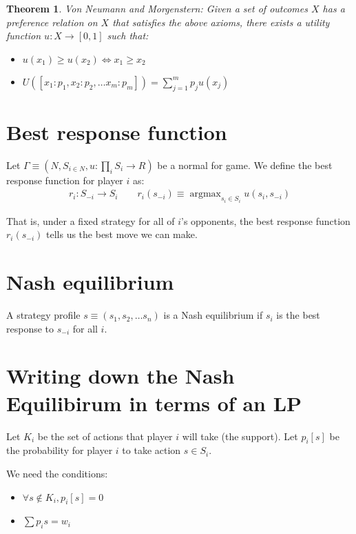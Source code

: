\documentclass[11pt]{book}
\DeclareMathOperator*{\argmax}{argmax} %
\newtheorem{theorem}[corollary]{Theorem}
\begin{document}
\begin{theorem}
    Von Neumann and Morgenstern: Given a set of outcomes $X$ has a preference
    relation on $X$ that satisfies the above axioms, there exists a utility function
    $u: X \rightarrow [0, 1]$ such that:
    \begin{itemize}
        \item $u(x_1) \geq u(x_2) \iff x_1 \geq x_2$
        \item $U([x_1: p_1, x_2:p_2, \dots x_m:p_m]) = \sum_{j=1}^m p_j u(x_j)$
    \end{itemize}
\end{theorem}



\section{Best response function}
Let $\Gamma \equiv (N, S_{i \in N}, u: \prod_i S_i \rightarrow R)$ be a normal
for game. We define the best response function for player $i$ as:
\begin{align*}
   r_i: S_{-i} \rightarrow S_i
    \qquad r_i(s_{-i}) \equiv \argmax_{s_i \in S_i}  u(s_i, s_{-i})
\end{align*}

That is, under a fixed strategy for all of $i$'s opponents, the best response
function $r_i(s_{-i})$ tells us the best move we can make.


\section{Nash equilibrium}

A strategy profile $s \equiv (s_1, s_2, \dots s_n)$ is a Nash equilibrium
if $s_i$ is the best response to $s_{-i}$ for all $i$.


\section{Writing down the Nash Equilibirum in terms of an LP}
Let $K_i$ be the set of actions that player $i$ will take (the support).
Let $p_i[s]$ be the probability for player $i$ to take action $s \in S_i$.

We need the conditions:
\begin{itemize}
    \item $\forall s \not \in K_i, p_i[s] = 0$
    \item $\sum p_i s = w_i$
\end{itemize}
\end{document}
